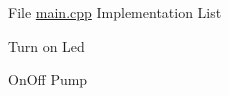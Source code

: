 
\begin{DoxyRefList}
\item[File \mbox{\hyperlink{main_8cpp}{main.cpp}} ]\label{todo__todo000001}%
%
Implementation List
\begin{DoxyItemize}
\item Turn on Led
\item On\+Off Pump 
\end{DoxyItemize}
\end{DoxyRefList}